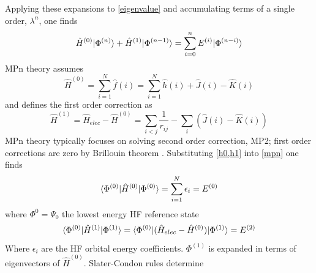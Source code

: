        Applying these expansions to \cref{eigenvalue} and accumulating terms of a single order, $\lambda^n$, one finds
         \begin{equation}\label{mpn}
         	  \hat{H}^{(0)}| \Phi^{(n)} \rangle + \hat{H}^{(1)}| \Phi^{(n-1)} \rangle = \sum_{i=0}^n E^{(i)} | \Phi^{(n-i)} \rangle
        \end{equation}  
      MPn theory assumes %
        \begin{equation}\label{h0}
          \hat{H}^{(0)} = \sum_{i=1}^N \hat{f}(i) = \sum_{i=1}^N \hat{h}(i) + \hat{J}(i) - \hat{K}(i)
        \end{equation}
      and defines the first order correction as 
        \begin{equation}\label{h1}
          \hat{H}^{(1)} = \hat{H}_{elec} - \hat{H}^{(0)} = \sum_{i<j} \frac{1}{r_{ij}} - \sum_i (\hat{J}(i) - \hat{K}(i))
        \end{equation}
      MPn theory typically focuses on solving second order correction, MP2; first order corrections are zero by Brillouin theorem \cite{surjan1989}.  Substituting \cref{h0,h1} into \cref{mpn} one finds 
        \begin{equation}
          \langle\Phi^{(0)} |\hat{H}^{(0)}| \Phi^{(0)} \rangle = \sum_{i=1}^N \epsilon_i = E^{(0)}
        \end{equation}
        where $\Phi^{0} = \Psi_0$ the lowest energy HF reference state 
        \begin{equation}
           \langle\Phi^{(0)} |\hat{H}^{(1)}| \Phi^{(1)} \rangle =\langle\Phi^{(0)} |(\hat{H}_{elec} - \hat{H}^{(0)}) | \Phi^{(1)} \rangle  =  E^{(2)}
         \end{equation}
       Where $\epsilon_i$ are the HF orbital energy coefficients. $\Phi^{(1)}$ is expanded in terms of eigenvectors of $\hat{H}^{(0)}$.  Slater-Condon rules\cite{SzaboAttila1982} determine %
